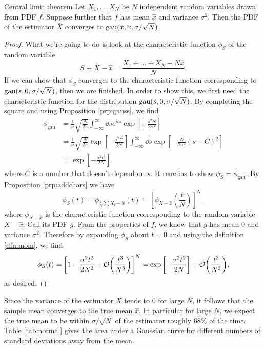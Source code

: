 \begin{theorem}{Central limit theorem}{}
  Let $X_1,...,X_N$ be $N$ independent random variables drawn from PDF $f$.
  Suppose further that $f$ has mean $\hat{x}$ and variance $\sigma^2$. 
  Then the PDF of the estimator $\bar{X}$ converges to 
  $\operatorname{gau}(\bar{x},\hat{x},\sigma/\sqrt{N})$.
  \begin{proof}
    What we're going to do is look at the characteristic function 
    $\phi_S$ of the random variable
    $$
      S\equiv\bar{X}-\hat{x}=\frac{X_1+...+X_N-N\hat{x}}{N}.
    $$
    If we can show that $\phi_S$ converges to the characteristic function
    corresponding to $\operatorname{gau}(s,0,\sigma/\sqrt{N})$, then we are finished.
    In order to show this, we first need the characteristic function for
    the distribution $\operatorname{gau}(s,0,\sigma/\sqrt{N})$. By completing the
    square and using Proposition \ref{prp:gauss}, we find 
    \begin{equation*}
      \begin{aligned}
        \phi_{\text{gau}}
            &=\frac{1}{\sigma}\sqrt{\frac{N}{2\pi}}\int_{-\infty}^\infty\dd{s}
              e^{its}\exp\left[-\frac{s^2N}{2\sigma^2}\right]\\
            &=\frac{1}{\sigma}\sqrt{\frac{N}{2\pi}}
              \exp\left[-\frac{\sigma^2t^2}{2N}\right]
              \int_{-\infty}^\infty\dd{s}
              \exp\left[-\frac{N}{2\sigma^2}(s-C)^2\right]\\
            &=\exp\left[-\frac{\sigma^2t^2}{2N}\right],
      \end{aligned}
    \end{equation*}
    where $C$ is a number that doesn't depend on $s$. It remains to show 
    $\phi_S=\phi_{\text{gau}}$. By Proposition \ref{prp:addchars} we have
    $$
      \phi_S(t)=\phi_{\frac{1}{N}\sum X_i-\hat{x}}(t)
               =\left[\phi_{X-\hat{x}}\left(\frac{t}{N}\right)\right]^N,
    $$
    where $\phi_{X-\hat{x}}$ is the characteristic function corresponding
    to the random variable $X-\hat{x}$. Call its PDF $g$. From the
    properties of $f$, we know that $g$ has mean 0 and variance $\sigma^2$.
    Therefore by expanding $\phi_S$ about $t=0$ and using the 
    definition \eqref{dfn:mom}, we find
    $$
      \phi_S(t)=\left[1-\frac{\sigma^2t^2}{2N^2}
             +\order{\frac{t^3}{N^3}}\right]^N
               =\exp\left[-\frac{\sigma^2t^2}{2N}\right]
             +\order{\frac{t^3}{N^2}},
    $$
    as desired.
  \end{proof}
\end{theorem}
Since the variance of the estimator $\bar{X}$ tends to 0 for large $N$,
it follows that the sample mean converges to the true mean $\hat{x}$.
In particular for large $N$, we expect the true mean to be within
$\sigma/\sqrt{N}$ of the estimator roughly 68\% of the time.
Table \ref{tab:normal} gives the area under a Gaussian curve 
for different numbers of standard deviations away from the mean. 

